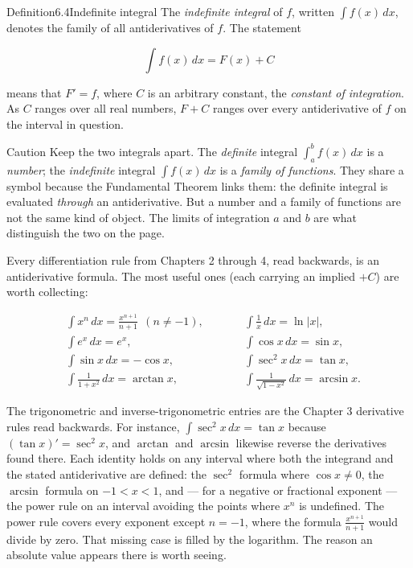 \documentclass[a4paper,12pt,oneside]{memoir}
\begin{document}
\begin{envdefinition}{Definition}{6.4}{Indefinite integral}
The \emph{indefinite integral} of \(f\), written \(\int f(x)\,dx\), denotes the family of all antiderivatives of \(f\). The statement

\[ \int f(x)\,dx = F(x) + C \]

means that \(F' = f\), where \(C\) is an arbitrary constant, the \emph{constant of integration}. As \(C\) ranges over all real numbers, \(F + C\) ranges over every antiderivative of \(f\) on the interval in question.
\end{envdefinition}
\begin{envcaution}{Caution}{}{}
Keep the two integrals apart. The \emph{definite} integral \(\int_{a}^{b} f(x)\,dx\) is a \emph{number}; the \emph{indefinite} integral \(\int f(x)\,dx\) is a \emph{family of functions}. They share a symbol because the Fundamental Theorem links them: the definite integral is evaluated \emph{through} an antiderivative. But a number and a family of functions are not the same kind of object. The limits of integration \(a\) and \(b\) are what distinguish the two on the page.
\end{envcaution}
Every differentiation rule from Chapters 2 through 4, read backwards, is an antiderivative formula. The most useful ones (each carrying an implied \(+C\)) are worth collecting:

\[ \begin{aligned}
    &\int x^{n}\,dx = \frac{x^{n+1}}{n+1} \ \ (n \ne -1), &\qquad &\int \frac{1}{x}\,dx = \ln\lvert x\rvert, \\[4pt]
    &\int e^{x}\,dx = e^{x}, &\qquad &\int \cos x\,dx = \sin x, \\[4pt]
    &\int \sin x\,dx = -\cos x, &\qquad &\int \sec^{2} x\,dx = \tan x, \\[4pt]
    &\int \frac{1}{1 + x^{2}}\,dx = \arctan x, &\qquad &\int \frac{1}{\sqrt{1 - x^{2}}}\,dx = \arcsin x.
  \end{aligned} \]

The trigonometric and inverse-trigonometric entries are the Chapter 3 derivative rules read backwards. For instance, \(\int \sec^{2} x\,dx = \tan x\) because \((\tan x)' = \sec^{2} x\), and \(\arctan\) and \(\arcsin\) likewise reverse the derivatives found there. Each identity holds on any interval where both the integrand and the stated antiderivative are defined: the \(\sec^{2}\) formula where \(\cos x \ne 0\), the \(\arcsin\) formula on \(-1 < x < 1\), and — for a negative or fractional exponent — the power rule on an interval avoiding the points where \(x^{n}\) is undefined. The power rule covers every exponent except \(n = -1\), where the formula \(\tfrac{x^{n+1}}{n+1}\) would divide by zero. That missing case is filled by the logarithm. The reason an absolute value appears there is worth seeing.
\end{document}
